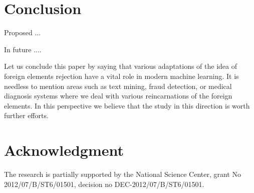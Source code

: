 \documentclass{llncs}
\begin{document}




\section{Conclusion}
  \label{sec:Conclusion}


Proposed ...


In future ....

Let us conclude this paper by saying that various adaptations of the idea of foreign elements rejection have a vital role in modern machine learning. It is needless to mention areas such as text mining, fraud detection, or medical diagnosis systems where we deal with various reincarnations of the foreign elements. In this perspective we believe that the study in this direction is worth further efforts.


\section*{Acknowledgment}

\noindent The research is partially supported  by the National Science Center, grant No 2012/07/B/ST6/01501, decision no \mbox{DEC-2012/07/B/ST6/01501}.
\end{document}

